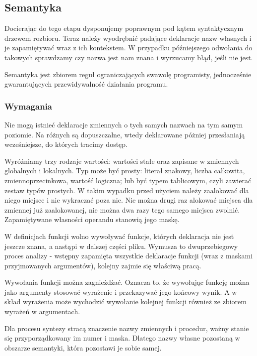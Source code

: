 \documentclass[a4paper,12pt]{article}
\begin{document}
\newpage


\newpage
\subsection{Semantyka}
Docierając do tego etapu dysponujemy poprawnym pod kątem syntaktycznym drzewem rozbioru. Teraz należy wyodrębnić padające deklaracje nazw własnych i je zapamiętywać wraz z ich kontekstem. W przypadku późniejszego odwołania do takowych sprawdzamy czy nazwa jest nam znana i wyrzucamy błąd, jeśli nie jest.

Semantyka jest zbiorem reguł ograniczających swawolę programisty, jednocześnie gwarantujących przewidywalność działania programu.
\subsubsection{Wymagania}
Nie mogą istnieć deklaracje zmiennych o tych samych nazwach na tym samym poziomie. Na różnych są dopuszczalne, wtedy deklarowane póżniej przesłaniają wcześniejsze, do których tracimy dostęp.

Wyróżniamy trzy rodzaje wartości: wartości stałe oraz zapisane w zmiennych globalnych i lokalnych. Typ może być prosty: literał znakowy, liczba całkowita, zmiennoprzecinkowa, wartość logiczna; lub być typem tablicowym, czyli zawierać zestaw typów prostych. W takim wypadku przed użyciem należy zaalokować dla niego miejsce i nie wykraczać poza nie. Nie można drugi raz alokować miejsca dla zmiennej już zaalokowanej, nie można dwa razy tego samego miejsca zwolnić. Zapamiętywane własności operandu stanowią jego maskę.

W definicjach funkcji wolno wywoływać funkcje, których deklaracja nie jest jeszcze znana, a nastąpi w dalszej części pliku. Wymusza to dwuprzebiegowy proces analizy - wstępny zapamięta wszystkie deklaracje funkcji (wraz z maskami przyjmowanych argumentów), kolejny zajmie się właściwą pracą.

Wywołania funkcji można zagnieżdżać. Oznacza to, że wywołując funkcję można jako argumenty stosować wyrażenie i przekazywać jego końcowy wynik. A w skład wyrażenia może wychodzić wywołanie kolejnej funkcji również ze zbiorem wyrażeń w argumentach.

Dla procesu syntezy stracą znaczenie nazwy zmiennych i procedur, ważny stanie się przyporządkowany im numer i maska. Dlatego nazwy własne pozostaną w obszarze semantyki, która pozostawi je sobie samej.
\end{document}
